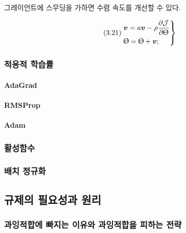 \documentclass [12pt] {oblivoir}
\let\oldsubsubsection=\subsubsection
\renewcommand{\subsubsection}
{
  \filbreak
  \oldsubsubsection
}
\begin{document}
그레이언트에 스무딩을 가하면 수렴 속도를 개선할 수 있다.

\begin{equation} \tag{3.21}
  \begin{rcases}
    \boldsymbol{v} = a\boldsymbol{v} - \rho\displaystyle\frac{\partial\mathcal{J}}{\partial\Uptheta} \\
    \Uptheta = \Uptheta + \boldsymbol{v};
  \end{rcases}
\end{equation}


\subsubsection{적응적 학습률}

\paragraph*{AdaGrad}\mbox{}

\vspace{3mm}

\paragraph*{RMSProp}\mbox{}

\vspace{3mm}

\paragraph*{Adam}\mbox{}

\vspace{3mm}

\subsubsection{활성함수}

\subsubsection{배치 정규화}

\subsection{규제의 필요성과 원리}

\subsubsection{과잉적합에 빠지는 이유와 과잉적합을 피하는 전략}
\end{document}
